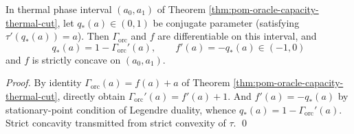 \begin{corollary}[Slope identification and conjugate parameter readout: \texorpdfstring{$q_*(a)=1-\Gamma'_{\mathrm{orc}}(a)$}{q*=1-Gamma'}]\label{cor:pom-oracle-capacity-slope-readout}
In thermal phase interval \((a_0,a_1)\) of Theorem \ref{thm:pom-oracle-capacity-thermal-cut},
let \(q_*(a)\in(0,1)\) be conjugate parameter (satisfying \(\tau'(q_*(a))=a\)).
Then \(\Gamma_{\mathrm{orc}}\) and \(f\) are differentiable on this interval, and
\[
\boxed{\;
q_*(a)=1-\Gamma_{\mathrm{orc}}'(a),
\qquad
f'(a)=-q_*(a)\in(-1,0)\;}
\]
and \(f\) is strictly concave on \((a_0,a_1)\).
\end{corollary}
\begin{proof}
By identity \(\Gamma_{\mathrm{orc}}(a)=f(a)+a\) of Theorem \ref{thm:pom-oracle-capacity-thermal-cut}, directly obtain
\(
\Gamma_{\mathrm{orc}}'(a)=f'(a)+1
\).
And \(f'(a)=-q_*(a)\) by stationary-point condition of Legendre duality, whence \(q_*(a)=1-\Gamma_{\mathrm{orc}}'(a)\).
Strict concavity transmitted from strict convexity of \(\tau\). \qed
\end{proof}

